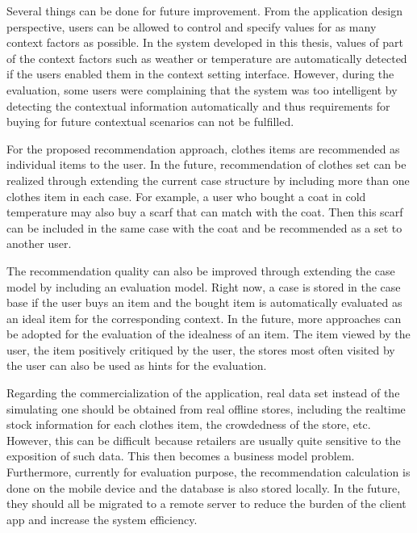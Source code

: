 Several things can be done for future improvement. From the application design perspective, users can be allowed to control and specify values for as many context factors as possible. In the system developed in this thesis, values of part of the context factors such as weather or temperature are automatically detected if the users enabled them in the context setting interface. However, during the evaluation, some users were complaining that the system was too intelligent by detecting the contextual information automatically and thus requirements for buying for future contextual scenarios can not be fulfilled. 

For the proposed recommendation approach, clothes items are recommended as individual items to the user. In the future, recommendation of clothes set can be realized through extending the current case structure by including more than one clothes item in each case. For example, a user who bought a coat in cold temperature may also buy a scarf that can match with the coat. Then this scarf can be included in the same case with the coat and be recommended as a set to another user.

The recommendation quality can also be improved through extending the case model by including an evaluation model. Right now, a case is stored in the case base if the user buys an item and the bought item is automatically evaluated as an ideal item for the corresponding context. In the future, more approaches can be adopted for the evaluation of the idealness of an item. The item viewed by the user, the item positively critiqued by the user, the stores most often visited by the user can also be used as hints for the evaluation. 

Regarding the commercialization of the application, real data set instead of the simulating one should be obtained from real offline stores, including the realtime stock information for each clothes item, the crowdedness of the store, etc. However, this can be difficult because retailers are usually quite sensitive to the exposition of such data. This then becomes a business model problem. Furthermore, currently for evaluation purpose, the recommendation calculation is done on the mobile device and the database is also stored locally. In the future, they should all be migrated to a remote server to reduce the burden of the client app and increase the system efficiency.

